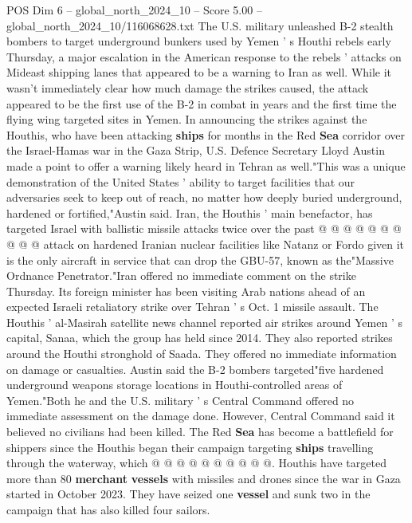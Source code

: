 \begin{textsample}{POS Dim 6 – global\_north\_2024\_10 – Score 5.00 – global\_north\_2024\_10/116068628.txt}  \label{ex:f6_pos_373}
The U.S. military unleashed B-2 stealth bombers to target underground bunkers used by Yemen ' s Houthi rebels early Thursday, a major escalation in the American response to the rebels ' attacks on Mideast shipping lanes that appeared to be a warning to Iran as well.
While it wasn't immediately clear how much damage the strikes caused, the attack appeared to be the first use of the B-2 in combat in years and the first time the flying wing targeted sites in Yemen.
In announcing the strikes against the Houthis, who have been attacking \textbf{ships} for months in the Red \textbf{Sea} corridor over the Israel-Hamas war in the Gaza Strip, U.S.
Defence Secretary Lloyd Austin made a point to offer a warning likely heard in Tehran as well."This was a unique demonstration of the United States ' ability to target facilities that our adversaries seek to keep out of reach, no matter how deeply buried underground, hardened or fortified,"Austin said.
Iran, the Houthis ' main benefactor, has targeted Israel with ballistic missile attacks twice over the past @ @ @ @ @ @ @ @ @ @ attack on hardened Iranian nuclear facilities like Natanz or Fordo given it is the only aircraft in service that can drop the GBU-57, known as the"Massive Ordnance Penetrator."Iran offered no immediate comment on the strike Thursday.
Its foreign minister has been visiting Arab nations ahead of an expected Israeli retaliatory strike over Tehran ' s Oct. 1 missile assault.
The Houthis ' al-Masirah satellite news channel reported air strikes around Yemen ' s capital, Sanaa, which the group has held since 2014.
They also reported strikes around the Houthi stronghold of Saada.
They offered no immediate information on damage or casualties.
Austin said the B-2 bombers targeted"five hardened underground weapons storage locations in Houthi-controlled areas of Yemen."Both he and the U.S. military ' s Central Command offered no immediate assessment on the damage done.
However, Central Command said it believed no civilians had been killed.
The Red \textbf{Sea} has become a battlefield for shippers since the Houthis began their campaign targeting \textbf{ships} travelling through the waterway, which @ @ @ @ @ @ @ @ @ @.
Houthis have targeted more than 80 \textbf{merchant} \textbf{vessels} with missiles and drones since the war in Gaza started in October 2023.
They have seized one \textbf{vessel} and sunk two in the campaign that has also killed four sailors.

\end{textsample}
